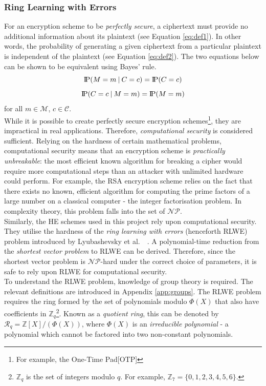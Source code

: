 \subsubsection{Ring Learning with Errors}
\indent \indent
For an encryption scheme to be \textit{perfectly secure}, a ciphertext must provide no additional information about its plaintext (see Equation \ref{eq:def1}). In other words, the probability of generating a given ciphertext from a particular plaintext is independent of the plaintext (see Equation \ref{eq:def2}). The two equations below can be shown to be equivalent using Bayes' rule. 
\begin{equation}
    \label{eq:def1}
    \text{I\kern-0.15em P}(M = m \: | \: C = c) = \text{I\kern-0.15em P}(C = c)
\end{equation}
\begin{equation}
    \label{eq:def2}
    \text{I\kern-0.15em P}(C = c \: | \: M = m) = \text{I\kern-0.15em P}(M = m)
\end{equation}
for all $m \in \mathcal{M}$, $c \in \mathcal{C}$.
\smallskip \\ \indent
While it is possible to create perfectly secure encryption schemes\footnote{For example, the One-Time Pad[OTP]}, they are impractical in real applications. Therefore, \textit{computational security} is considered sufficient. Relying on the hardness of certain mathematical problems, computational security means that an encryption scheme is \textit{practically unbreakable}: the most efficient known algorithm for breaking a cipher would require more computational steps than an attacker with unlimited hardware could perform. For example, the RSA encryption scheme relies on the fact that there exists no known, efficient algorithm for computing the prime factors of a large number on a classical computer - the integer factorisation problem. In complexity theory, this problem falls into the set of $\mathcal{NP}$.
\smallskip \\ \indent
Similarly, the HE schemes used in this project rely upon computational security. They utilise the hardness of the \textit{ring learning with errors} (henceforth RLWE) problem introduced by Lyubashevsky et al.\ ~\cite{RLWE}. A polynomial-time reduction from the \textit{shortest vector problem} to RLWE can be derived. Therefore, since the shortest vector problem is $\mathcal{NP}$-hard under the correct choice of parameters, it is safe to rely upon RLWE for computational security.
\smallskip \\ \indent
To understand the RLWE problem, knowledge of group theory is required. The relevant definitions are introduced in Appendix \ref{app:groups}. The RLWE problem requires the ring formed by the set of polynomials modulo $\Phi (X)$ that also have coefficients in $\mathbb{Z}_q$\footnote{$\mathbb{Z}_q$ is the set of integers modulo $q$. For example, $\mathbb{Z}_7 = \{0, 1, 2, 3, 4, 5, 6\}$.}. Known as a \textit{quotient ring}, this can be denoted by $\mathcal{R}_q = \mathbb{Z}[X] / (\Phi(X))$, where $\Phi(X)$ is an \textit{irreducible polynomial} - a polynomial which cannot be factored into two non-constant polynomials.
